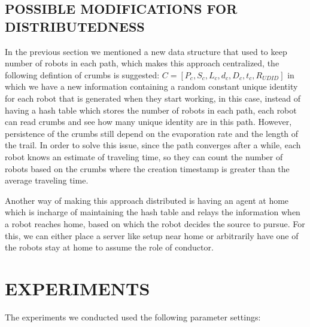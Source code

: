 \documentclass[letterpaper, 10 pt, conference]{ieeeconf}  %
\begin{document}
\subsection{POSSIBLE MODIFICATIONS FOR DISTRIBUTEDNESS}
In the previous section we mentioned a new data structure that used to keep number of robots in each path, which makes this approach centralized, the following defintion of crumbs is suggested: $C = [P_c, S_c, L_c, d_c, D_c, t_c, R_{UDID}]$ in which we have a new information containing a random constant unique identity for each robot that is generated when they start working, in this case, instead of having a hash table which stores the number of robots in each path, each robot can read crumbs and see how many unique identity are in this path. However, persistence of the crumbs still depend on the evaporation rate and the length of the trail. In order to solve this issue, since the path converges after a while, each robot knows an estimate of traveling time, so they can count the number of robots based on the crumbs where the creation timestamp is greater than the average traveling time.

Another way of making this approach distributed is having an agent at home which is incharge of maintaining the hash table and relays the information when a robot reaches home, based on which the robot decides the source to pursue. For this, we can either place a server like setup near home or arbitrarily have one of the robots stay at home to assume the role of conductor.

\section{EXPERIMENTS} \label{section:experiments}

The experiments we conducted used the following parameter settings:
\end{document}
